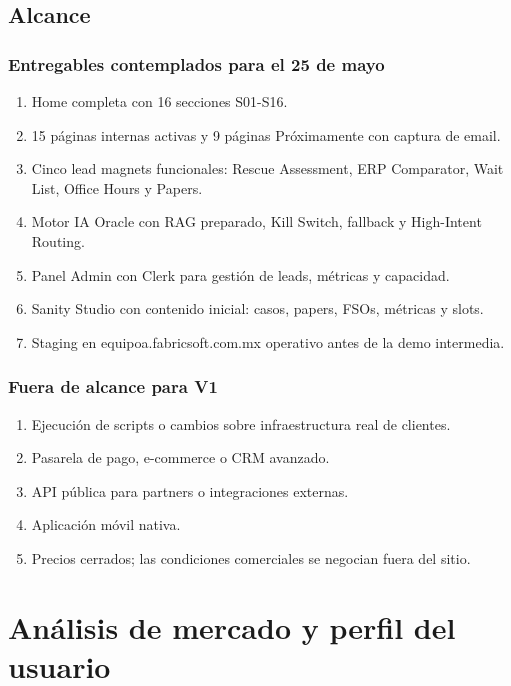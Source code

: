 \documentclass[11pt,letterpaper]{article}
\begin{document}
\subsection{Alcance}

\subsubsection{Entregables contemplados para el 25 de mayo}

\begin{enumerate}
\item Home completa con 16 secciones S01-S16.
\item 15 páginas internas activas y 9 páginas Próximamente con captura de email.
\item Cinco lead magnets funcionales: Rescue Assessment, ERP Comparator, Wait List, Office Hours y Papers.
\item Motor IA Oracle con RAG preparado, Kill Switch, fallback y High-Intent Routing.
\item Panel Admin con Clerk para gestión de leads, métricas y capacidad.
\item Sanity Studio con contenido inicial: casos, papers, FSOs, métricas y slots.
\item Staging en equipoa.fabricsoft.com.mx operativo antes de la demo intermedia.
\end{enumerate}

\subsubsection{Fuera de alcance para V1}

\begin{enumerate}
\item Ejecución de scripts o cambios sobre infraestructura real de clientes.
\item Pasarela de pago, e-commerce o CRM avanzado.
\item API pública para partners o integraciones externas.
\item Aplicación móvil nativa.
\item Precios cerrados; las condiciones comerciales se negocian fuera del sitio.
\end{enumerate}

\section{Análisis de mercado y perfil del usuario}
\end{document}

